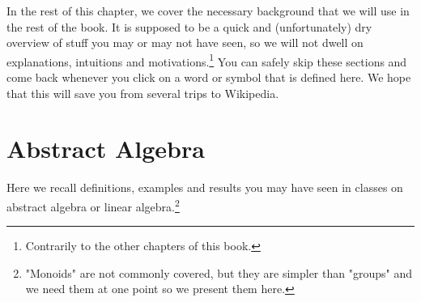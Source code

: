 \documentclass[main.tex]{subfiles}
\begin{document}
In the rest of this chapter, we cover the necessary background that we will use in the rest of the book. It is supposed to be a quick and (unfortunately) dry overview of stuff you may or may not have seen, so we will not dwell on explanations, intuitions and motivations.\footnote{Contrarily to the other chapters of this book.} You can safely skip these sections and come back whenever you click on a word or symbol that is defined here. We hope that this will save you from several trips to Wikipedia.
\section{Abstract Algebra}
Here we recall definitions, examples and results you may have seen in classes on abstract algebra or linear algebra.\footnote{"Monoids" are not commonly covered, but they are simpler than "groups" and we need them at one point so we present them here.}
\end{document}
